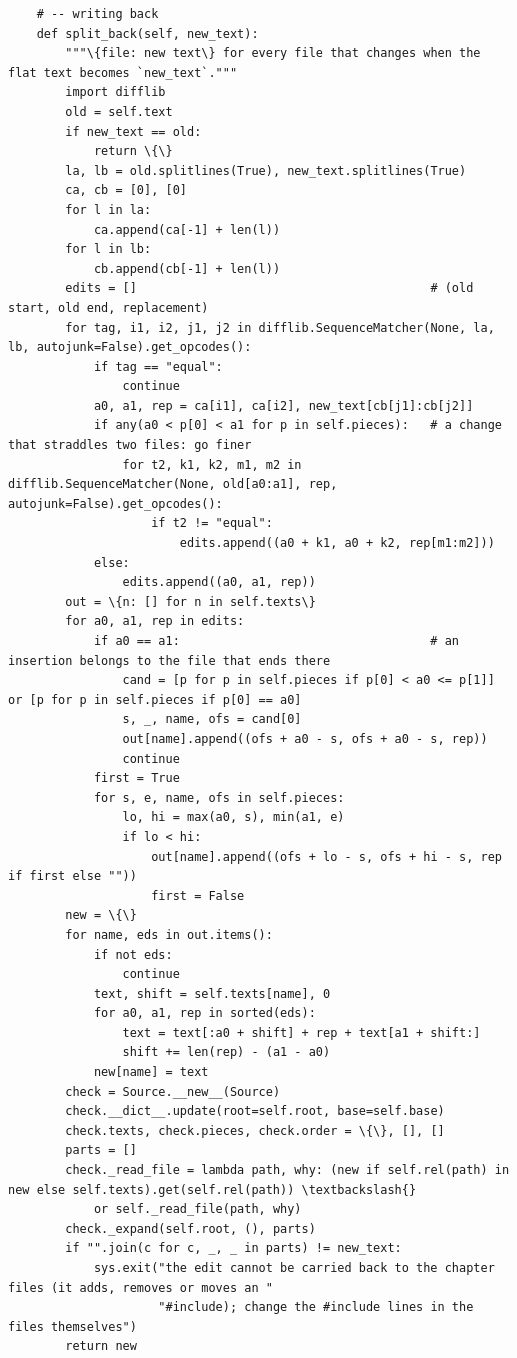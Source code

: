 \documentclass[10pt,a4paper]{article}
\begin{document}
\begin{Verbatim}
    # -- writing back
    def split_back(self, new_text):
        """\{file: new text\} for every file that changes when the flat text becomes `new_text`."""
        import difflib
        old = self.text
        if new_text == old:
            return \{\}
        la, lb = old.splitlines(True), new_text.splitlines(True)
        ca, cb = [0], [0]
        for l in la:
            ca.append(ca[-1] + len(l))
        for l in lb:
            cb.append(cb[-1] + len(l))
        edits = []                                         # (old start, old end, replacement)
        for tag, i1, i2, j1, j2 in difflib.SequenceMatcher(None, la, lb, autojunk=False).get_opcodes():
            if tag == "equal":
                continue
            a0, a1, rep = ca[i1], ca[i2], new_text[cb[j1]:cb[j2]]
            if any(a0 < p[0] < a1 for p in self.pieces):   # a change that straddles two files: go finer
                for t2, k1, k2, m1, m2 in difflib.SequenceMatcher(None, old[a0:a1], rep, autojunk=False).get_opcodes():
                    if t2 != "equal":
                        edits.append((a0 + k1, a0 + k2, rep[m1:m2]))
            else:
                edits.append((a0, a1, rep))
        out = \{n: [] for n in self.texts\}
        for a0, a1, rep in edits:
            if a0 == a1:                                   # an insertion belongs to the file that ends there
                cand = [p for p in self.pieces if p[0] < a0 <= p[1]] or [p for p in self.pieces if p[0] == a0]
                s, _, name, ofs = cand[0]
                out[name].append((ofs + a0 - s, ofs + a0 - s, rep))
                continue
            first = True
            for s, e, name, ofs in self.pieces:
                lo, hi = max(a0, s), min(a1, e)
                if lo < hi:
                    out[name].append((ofs + lo - s, ofs + hi - s, rep if first else ""))
                    first = False
        new = \{\}
        for name, eds in out.items():
            if not eds:
                continue
            text, shift = self.texts[name], 0
            for a0, a1, rep in sorted(eds):
                text = text[:a0 + shift] + rep + text[a1 + shift:]
                shift += len(rep) - (a1 - a0)
            new[name] = text
        check = Source.__new__(Source)
        check.__dict__.update(root=self.root, base=self.base)
        check.texts, check.pieces, check.order = \{\}, [], []
        parts = []
        check._read_file = lambda path, why: (new if self.rel(path) in new else self.texts).get(self.rel(path)) \textbackslash{}
            or self._read_file(path, why)
        check._expand(self.root, (), parts)
        if "".join(c for c, _, _ in parts) != new_text:
            sys.exit("the edit cannot be carried back to the chapter files (it adds, removes or moves an "
                     "#include); change the #include lines in the files themselves")
        return new


\end{Verbatim}
\end{document}
